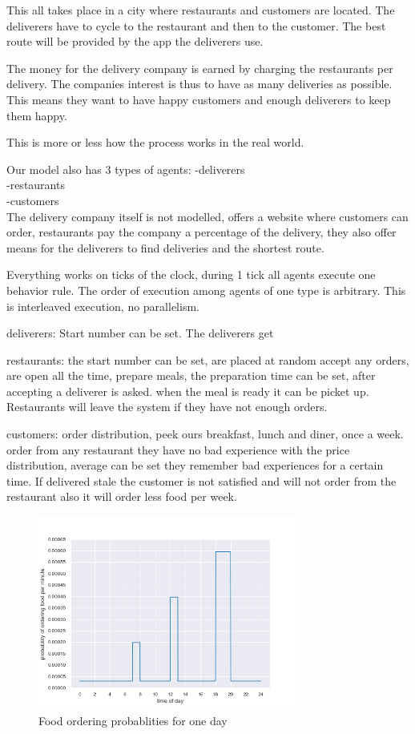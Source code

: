 This all takes place in a city where restaurants and customers are located.
The deliverers have to cycle to the restaurant and then to the customer.
The best route will be provided by the app the deliverers use.

The money for the delivery company is earned by charging the restaurants per delivery.
The companies interest is thus to have as many deliveries as possible.
This means they want to have happy customers and enough deliverers to keep them happy.

This is more or less how the process works in the real world.

Our model also has 3 types of agents:
-deliverers \\
-restaurants \\
-customers \\


The delivery company itself is not modelled, offers a website where customers can order,
restaurants pay the company a percentage of the delivery, they also offer means for the deliverers to
find deliveries and the shortest route.

Everything works on ticks of the clock, during 1 tick all agents execute one behavior rule.
The order of execution among agents of one type is arbitrary.
This is interleaved execution, no parallelism.


deliverers:
Start number can be set.
The deliverers get


restaurants:
the start number can be set, are placed at random
accept any orders, are open all the time,
prepare meals, the preparation time can be set,
after accepting a deliverer is asked.
when the meal is ready it can be picket up.
Restaurants will leave the system if they have not enough orders.

customers:
order distribution, peek ours breakfast, lunch and  diner, once a week.
order from any restaurant they have no bad experience with
the price distribution, average can be set
they remember bad experiences for a certain time.
If delivered stale the customer is not satisfied and will not order from the restaurant also
it will order less food per week.

\begin{figure}
    \centering
    \includegraphics[width=8.5cm]{sections/pics/food_ordering_distribution}
    \caption{Food ordering probablities for one day}
    \label{fig:food_ordering_distribution}
\end{figure}



